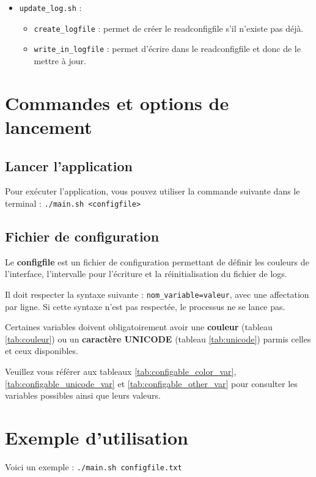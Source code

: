 \documentclass{article}
\begin{document}
\begin{itemize}
\begin{itemize}[label=\textbullet]
        \end{itemize}
        \vspace{0.3em}
    \item \texttt{update\_log.sh} :
        \begin{itemize}[label=\textbullet]
            \item \texttt{create\_logfile} : permet de créer le readconfigfile s'il n'existe pas déjà.
            \item \texttt{write\_in\_logfile} : permet d'écrire dans le readconfigfile et donc de le mettre à jour.
        \end{itemize}
\end{itemize}

\section{Commandes et options de lancement}

\subsection{Lancer l'application}
Pour exécuter l'application, vous pouvez utiliser la commande suivante dans le terminal :  
\texttt{./main.sh <configfile>}

\subsection{Fichier de configuration}
Le \textbf{configfile} est un fichier de configuration permettant de définir les couleurs de l'interface, l'intervalle pour l'écriture et la réinitialisation du fichier de logs.
  
Il doit respecter la syntaxe suivante : \texttt{nom\_variable=valeur}, avec une affectation par ligne. Si cette syntaxe n'est pas respectée, le processus ne se lance pas.
\vspace{1em}

Certaines variables doivent obligatoirement avoir une \textbf{couleur} (tableau \ref{tab:couleur}) ou un \textbf{caractère UNICODE} (tableau \ref{tab:unicode}) parmis celles et ceux disponibles.
  
Veuillez vous référer aux tableaux \ref{tab:configable_color_var}, \ref{tab:configable_unicode_var} et \ref{tab:configable_other_var} pour consulter les variables possibles ainsi que leurs valeurs.

\section{Exemple d'utilisation}
Voici un exemple : \texttt{./main.sh configfile.txt}
  
\end{document}
